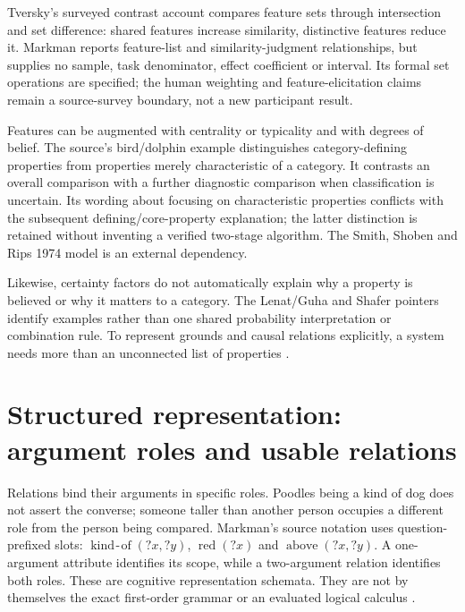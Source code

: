 Tversky's surveyed contrast account compares feature sets through
intersection and set difference: shared features increase similarity,
distinctive features reduce it. Markman reports feature-list and
similarity-judgment relationships, but supplies no sample, task
denominator, effect coefficient or interval. Its formal set operations
are specified; the human weighting and feature-elicitation claims
remain a source-survey boundary, not a new participant result.

Features can be augmented with centrality or typicality and with
degrees of belief. The source's bird/dolphin example distinguishes
category-defining properties from properties merely characteristic
of a category. It contrasts an overall comparison with a further
diagnostic comparison when classification is uncertain. Its wording
about focusing on characteristic properties conflicts with the
subsequent defining/core-property explanation; the latter distinction
is retained without inventing a verified two-stage algorithm.
The Smith, Shoben and Rips 1974 model is an external dependency.

Likewise, certainty factors do not automatically explain why a
property is believed or why it matters to a category. The Lenat/Guha
and Shafer pointers identify examples rather than one shared
probability interpretation or combination rule. To represent grounds
and causal relations explicitly, a system needs more than an
unconnected list of properties
\cite[pp.~42--43]{Markman2012CognitiveRepresentation}.

\section{Structured representation: argument roles and usable relations}
\label{sec:p19-ckr-structured}

Relations bind their arguments in specific roles. Poodles being a
kind of dog does not assert the converse; someone taller than
another person occupies a different role from the person being
compared. Markman's source notation uses question-prefixed slots:
\(\operatorname{kind\!-\!of}(?x,?y)\),
\(\operatorname{red}(?x)\) and
\(\operatorname{above}(?x,?y)\). A one-argument attribute identifies
its scope, while a two-argument relation identifies both roles.
These are cognitive representation schemata. They are not by
themselves the exact first-order grammar or an evaluated logical
calculus \cite[p.~43]{Markman2012CognitiveRepresentation}.

